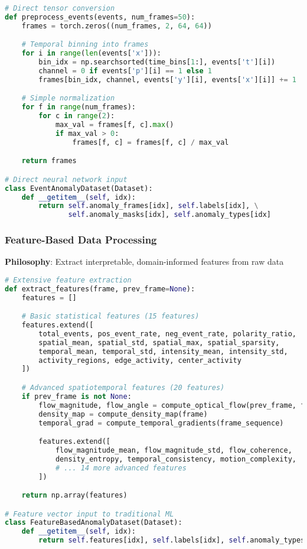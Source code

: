 \documentclass[11pt,a4paper]{article}
\begin{document}
\begin{lstlisting}[language=Python, caption=Architecture-Based Data Flow]
# Direct tensor conversion
def preprocess_events(events, num_frames=50):
    frames = torch.zeros((num_frames, 2, 64, 64))

    # Temporal binning into frames
    for i in range(len(events['x'])):
        bin_idx = np.searchsorted(time_bins[1:], events['t'][i])
        channel = 0 if events['p'][i] == 1 else 1
        frames[bin_idx, channel, events['y'][i], events['x'][i]] += 1

    # Simple normalization
    for f in range(num_frames):
        for c in range(2):
            max_val = frames[f, c].max()
            if max_val > 0:
                frames[f, c] = frames[f, c] / max_val

    return frames

# Direct neural network input
class EventAnomalyDataset(Dataset):
    def __getitem__(self, idx):
        return self.anomaly_frames[idx], self.labels[idx], \
               self.anomaly_masks[idx], self.anomaly_types[idx]
\end{lstlisting}

\subsubsection{Feature-Based Data Processing}
\textbf{Philosophy}: Extract interpretable, domain-informed features from raw data

\begin{lstlisting}[language=Python, caption=Feature-Based Data Flow]
# Extensive feature extraction
def extract_features(frame, prev_frame=None):
    features = []

    # Basic statistical features (15 features)
    features.extend([
        total_events, pos_event_rate, neg_event_rate, polarity_ratio,
        spatial_mean, spatial_std, spatial_max, spatial_sparsity,
        temporal_mean, temporal_std, intensity_mean, intensity_std,
        activity_regions, edge_activity, center_activity
    ])

    # Advanced spatiotemporal features (20 features)
    if prev_frame is not None:
        flow_magnitude, flow_angle = compute_optical_flow(prev_frame, frame)
        density_map = compute_density_map(frame)
        temporal_grad = compute_temporal_gradients(frame_sequence)

        features.extend([
            flow_magnitude_mean, flow_magnitude_std, flow_coherence,
            density_entropy, temporal_consistency, motion_complexity,
            # ... 14 more advanced features
        ])

    return np.array(features)

# Feature vector input to traditional ML
class FeatureBasedAnomalyDataset(Dataset):
    def __getitem__(self, idx):
        return self.features[idx], self.labels[idx], self.anomaly_types[idx]
\end{lstlisting}
\end{document}
